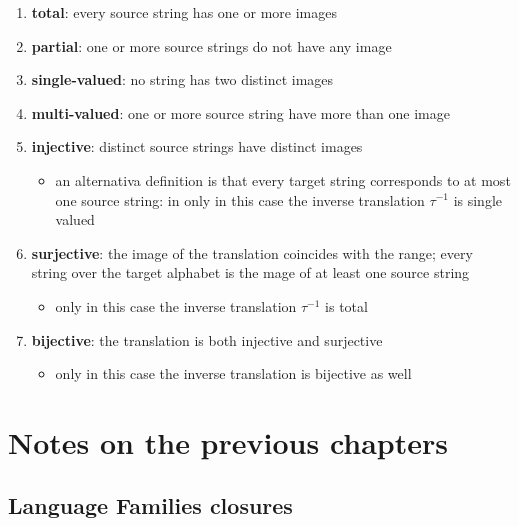 \documentclass[english]{article}
\begin{document}
\begin{enumerate}
  \item \textbf{total}: every source string has one or more images
  \item \textbf{partial}: one or more source strings do not have any image
  \item \textbf{single-valued}: no string has two distinct images
  \item \textbf{multi-valued}: one or more source string have more than one image
  \item \textbf{injective}: distinct source strings have distinct images
        \begin{itemize}[label=\(\rightarrow\)]
          \item an alternativa definition is that every target string corresponds to at most one source string: in only in this case the inverse translation \(\tau^{-1}\) is single valued
        \end{itemize}
  \item \textbf{surjective}: the image of the translation coincides with the range; every string over the target alphabet is the mage of at least one source string
        \begin{itemize}[label=\(\rightarrow\)]
          \item only in this case the inverse translation \(\tau^{-1}\) is total
        \end{itemize}
  \item \textbf{bijective}: the translation is both injective and surjective
        \begin{itemize}[label=\(\rightarrow\)]
          \item only in this case the inverse translation is bijective as well
        \end{itemize}
\end{enumerate}



\clearpage

\section{Notes on the previous chapters}

\subsection{Language Families closures}
\end{document}
